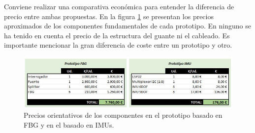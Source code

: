 	
	Conviene realizar una comparativa económica para entender la diferencia de precio entre ambas propuestas. En la figura \ref{fig:precioCompara} se presentan los precios aproximados de los componentes fundamentales de cada prototipo. En ninguno se ha tenido en cuenta el precio de la estructura del guante ni el cableado. Es importante mencionar la gran diferencia de coste entre un prototipo y otro.
	
	\begin{figure}[H]
		\centering
		\includegraphics[width=\textwidth]{./img/precios2}
		\caption{Precios orientativos de los componentes en el prototipo basado en FBG y en el basado en IMUs. } 
		\label{fig:precioCompara}
	\end{figure} 
	
	
	